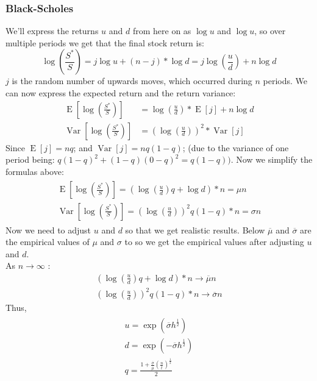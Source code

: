 \documentclass{article}
\DeclareMathOperator{\Var}{Var}
\DeclareMathOperator{\E}{E}
\begin{document}
\subsubsection{Black-Scholes}
We’ll express the returns $u$ and $d$ from here on as $\log u$ and $\log u$, so over multiple periods we get that the final stock return is:
\begin{equation}\label{eq:11}
    \log (\frac{S^{*}}{S}) =  j \log u + (n - j) * \log d = j \log \left(\frac{u}{d}\right) + n \log d
\end{equation}
$j$ is the random number of upwards moves, which occurred during $n$ periods. We can now express the expected return and the return variance:
\begin{align*}
    \E[\log (\frac{S^{*}}{S})] &= \log \left(\frac{u}{d}\right)*\E[j] + n \log d \\
    \Var[\log (\frac{S^{*}}{S})]& = (\log \left(\frac{u}{d}\right))^{2}*\Var[j]
\end{align*}
Since $\E[j] = n q$; and $\Var[j] = n q (1 - q)$; (due to the variance of one period being: $q(1-q)^{2} + (1-q)(0 - q)^{2} = q(1-q))$. Now we simplify the formulas above:
\begin{gather}
\begin{split}
    \E\left[\log \left(\frac{S^{*}}{S}\right)\right] = (\log \left(\frac{u}{d}\right)q +\log d)*n  = \mu n \\
    \Var\left[\log \left(\frac{S^{*}}{S}\right)\right] = (\log \left(\frac{u}{d}\right))^{2}q(1-q)*n = \sigma n
\end{split}
\end{gather}
Now we need to adjust $u$ and $d$ so that we get realistic results. Below $\overline{\mu}$ and $\overline{\sigma}$ are the empirical values of $\mu$ and $\sigma$ to so we get the empirical values after adjusting $u$ and $d$. \\ [3ex]
As $n \rightarrow \infty$ :
\begin{gather*}
    (\log \left(\frac{u}{d}\right)q +\log d)*n \rightarrow \overline{\mu}n \\
    (\log \left(\frac{u}{d}\right))^{2}q(1-q)*n \rightarrow \overline{\sigma} n
\end{gather*}
Thus, 
\begin{gather}
\begin{split}
    u = \exp\left(\overline{\sigma}h^{\frac{1}{2}}\right) \\
    d = \exp\left(-\overline{\sigma}h^{\frac{1}{2}}\right) \\
    q = \frac{1+\frac{\overline{\sigma}}{\overline{\mu}}\left(\frac{n}{t}\right)^{\frac{1}{2}}}{2}
\end{split}
\end{gather}
\end{document}
